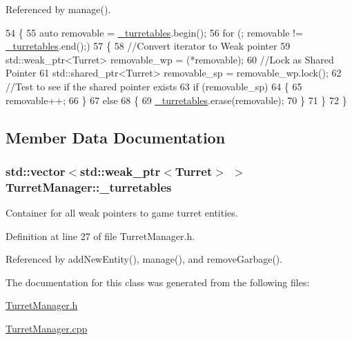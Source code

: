 Referenced by manage().


\begin{DoxyCode}
54 \{
55     \textcolor{keyword}{auto} removable = \hyperlink{classTurretManager_a1089603cbf805dfb737b2a47d462a9bb}{\_turretables}.begin();
56     \textcolor{keywordflow}{for} (; removable != \hyperlink{classTurretManager_a1089603cbf805dfb737b2a47d462a9bb}{\_turretables}.end();)
57     \{
58         \textcolor{comment}{//Convert iterator to Weak pointer}
59         std::weak\_ptr<Turret> removable\_wp = (*removable);
60         \textcolor{comment}{//Lock as Shared Pointer}
61         std::shared\_ptr<Turret> removable\_sp = removable\_wp.lock();
62         \textcolor{comment}{//Test to see if the shared pointer exists}
63         \textcolor{keywordflow}{if} (removable\_sp)
64         \{
65             removable++;
66         \}
67         \textcolor{keywordflow}{else}
68         \{
69             \hyperlink{classTurretManager_a1089603cbf805dfb737b2a47d462a9bb}{\_turretables}.erase(removable);
70         \}
71     \}
72 \}
\end{DoxyCode}


\subsection{Member Data Documentation}
\hypertarget{classTurretManager_a1089603cbf805dfb737b2a47d462a9bb}{
\subsubsection[{\-\_\-turretables}]{\setlength{\rightskip}{0pt plus 5cm}std\-::vector$<$std\-::weak\-\_\-ptr$<${\bf Turret}$>$ $>$ Turret\-Manager\-::\-\_\-turretables\hspace{0.3cm}{\ttfamily [private]}}}\label{classTurretManager_a1089603cbf805dfb737b2a47d462a9bb}


Container for all weak pointers to game turret entities. 



Definition at line 27 of file Turret\-Manager.\-h.



Referenced by add\-New\-Entity(), manage(), and remove\-Garbage().



The documentation for this class was generated from the following files\-:\begin{DoxyCompactItemize}
\item 
\hyperlink{TurretManager_8h}{Turret\-Manager.\-h}\item 
\hyperlink{TurretManager_8cpp}{Turret\-Manager.\-cpp}\end{DoxyCompactItemize}

